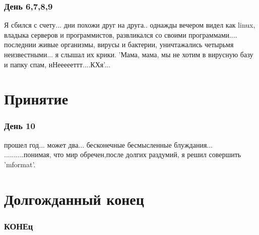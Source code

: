 \documentclass[xcolor=dvipsnames,aspectratio=169,12pt]{beamer}
\begin{document}
\begin{frame}\frametitle{День 6,7,8,9}
    Я сбился с счету... дни похожи друг на друга.. однажды вечером видел как linux, владыка серверов и программистов, развликался со своими программами.... последнии живые организмы, вирусы и бактерии, уничтажались четырьмя неизвестными... я слышал их крики. 'Мама, мама, мы не хотим в вирусную базу и папку спам, нНеееееттт....КХя'... 
\end{frame}

\section{Принятие}
\begin{frame}\frametitle{День 10}
    прошел год... может два... бесконечные бесмысленные блуждания... 
    ..........понимая, что мир обречен,после долгих раздумий, я решил совершить 'mformat'.
\end{frame}

\section{Долгожданный конец}
\begin{frame}\frametitle{КОНЕц}
\end{frame}
\end{document}
